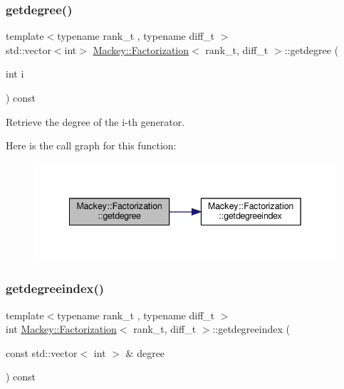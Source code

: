 \subsubsection{\texorpdfstring{getdegree()}{getdegree()}}
{\footnotesize\ttfamily template$<$typename rank\+\_\+t , typename diff\+\_\+t $>$ \\
std\+::vector$<$int$>$ \hyperlink{classMackey_1_1Factorization}{Mackey\+::\+Factorization}$<$ rank\+\_\+t, diff\+\_\+t $>$\+::getdegree (\begin{DoxyParamCaption}\item[{int}]{i }\end{DoxyParamCaption}) const\hspace{0.3cm}{\ttfamily [inline]}}



Retrieve the degree of the i-\/th generator. 

Here is the call graph for this function\+:\nopagebreak
\begin{figure}[H]
\begin{center}
\leavevmode
\includegraphics[width=342pt]{classMackey_1_1Factorization_a273e9318c0a5eacacd584474f93ffe4a_cgraph}
\end{center}
\end{figure}
\mbox{\label{classMackey_1_1Factorization_ab90f461af3418417970d4be8682e965d}} 
\subsubsection{\texorpdfstring{getdegreeindex()}{getdegreeindex()}}
{\footnotesize\ttfamily template$<$typename rank\+\_\+t , typename diff\+\_\+t $>$ \\
int \hyperlink{classMackey_1_1Factorization}{Mackey\+::\+Factorization}$<$ rank\+\_\+t, diff\+\_\+t $>$\+::getdegreeindex (\begin{DoxyParamCaption}\item[{const std\+::vector$<$ int $>$ \&}]{degree }\end{DoxyParamCaption}) const\hspace{0.3cm}{\ttfamily [inline]}}




